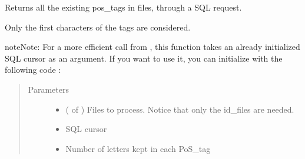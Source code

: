 \documentclass[letterpaper,10pt,english]{sphinxmanual}
\begin{document}
\begin{fulllineitems}
\label{\detokenize{analysis:loacore.analysis.frequencies.get_pos_tag_set}}
Returns all the existing pos\_tags in files, through a SQL request.

Only the first  characters of the tags are considered.

\begin{sphinxadmonition}{note}{Note:}
For a more efficient call from {\hyperref[\detokenize{analysis:loacore.analysis.frequencies.pos_tag_frequencies}]{}}, this function takes an already initialized SQL
cursor as an argument.
If you want to use it, you can initialize  with the following code :

%
\begin{sphinxVerbatim}[commandchars=\\\{\}]
   
   
  
  
\end{sphinxVerbatim}
\end{sphinxadmonition}
\begin{quote}\begin{description}
\item[{Parameters}] \leavevmode\begin{itemize}
\item {} 
 ( of {\hyperref[\detokenize{classes:loacore.classes.classes.File}]{}}) \textendash{} Files to process. Notice that only the id\_files are needed.

\item {} 
 \textendash{} SQL cursor

\item {} 
 \textendash{} Number of letters kept in each PoS\_tag


\end{itemize}
\end{description}
\end{quote}
\end{fulllineitems}
\end{document}
